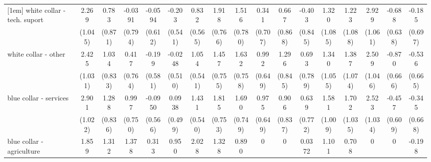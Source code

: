{\begin{tabular}{l*{16}{c}}
[1em]
white collar - tech. suport&       2.269\sym{*}  &       0.783         &     -0.0391         &     -0.0594         &      -0.203         &       0.832         &       1.918\sym{*}  &       1.516         &       0.341         &       0.667         &      -0.403         &       1.320         &       1.223         &       2.929\sym{**} &      -0.688         &      -0.185         \\
                    &     (1.045)         &     (0.871)         &     (0.794)         &     (0.612)         &     (0.541)         &     (0.565)         &     (0.766)         &     (0.780)         &     (0.707)         &     (0.868)         &     (0.845)         &     (1.085)         &     (1.088)         &     (1.061)         &     (0.638)         &     (0.697)         \\
[1em]
white collar - other&       2.425\sym{*}  &       1.034         &       0.417         &      -0.199         &     -0.0248         &       1.054         &       1.457         &       1.632\sym{*}  &       0.992         &       1.296         &       0.693         &       1.340         &       1.387         &       2.509\sym{*}  &      -0.870         &      -0.536         \\
                    &     (1.031)         &     (0.833)         &     (0.764)         &     (0.581)         &     (0.510)         &     (0.541)         &     (0.755)         &     (0.758)         &     (0.649)         &     (0.845)         &     (0.789)         &     (1.055)         &     (1.074)         &     (1.046)         &     (0.666)         &     (0.665)         \\
[1em]
blue collar - services&       2.901\sym{**} &       1.288         &       0.997         &     -0.0950         &      0.0938         &       1.431\sym{**} &       1.815\sym{*}  &       1.690\sym{*}  &       0.975         &       0.906         &       0.639         &       1.581         &       1.702         &       2.523\sym{*}  &      -0.457         &      -0.345         \\
                    &     (1.022)         &     (0.836)         &     (0.750)         &     (0.566)         &     (0.499)         &     (0.540)         &     (0.753)         &     (0.749)         &     (0.649)         &     (0.837)         &     (0.772)         &     (1.009)         &     (1.035)         &     (1.034)         &     (0.609)         &     (0.668)         \\
[1em]
blue collar - agriculture&       1.859         &       1.312         &       1.378         &       0.313         &       0.950         &       2.028\sym{**} &       1.328         &       0.890         &           0         &           0         &      0.0372         &       1.101         &       0.708         &           0         &           0         &      -0.198         \\

\end{tabular}}
